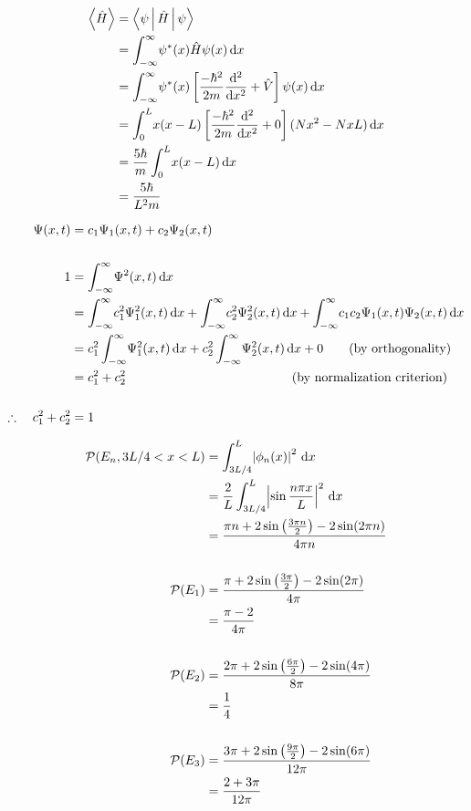 \documentclass[12pt]{article}
\begin{document}
\problemasub
\begin{align*}
\Braket{\hat{H}} &= \Braket{\psi|\hat{H}|\psi} \\
&= \int_{-\infty}^{\infty}\! \psi^*(x)\hat{H}\psi(x) \,\mathrm{d} x \\
&= \int_{-\infty}^{\infty}\! \psi^*(x)\left[\frac{-\hbar^2}{2m}\frac{\mathrm{d}^2}{\mathrm{d} x^2} + \hat{V}\right]\psi(x) \,\mathrm{d} x \\
&= \int_{0}^{L}\! x(x-L)\left[\frac{-\hbar^2}{2m}\frac{\mathrm{d}^2}{\mathrm{d} x^2} + 0\right] (Nx^2-NxL) \,\mathrm{d} x \\
&= \frac{5\hbar}{m}\int_{0}^{L}\! x(x-L) \,\mathrm{d} x \\
&= \frac{5\hbar}{L^2m} \\
\end{align*}

\newpage
{}
\problem
\begin{align*}
\Psi(x,t) &= c_1\Psi_1(x,t) + c_2\Psi_2(x,t) \\
\\
1 &= \int_{-\infty}^{\infty} \! \Psi^2(x,t) \, \mathrm{d} x \\
 &= \int_{-\infty}^{\infty} \! c_1^2\Psi_1^2(x,t) \, \mathrm{d} x + \int_{-\infty}^{\infty} \! c_2^2\Psi_2^2(x,t) \, \mathrm{d} x + \int_{-\infty}^{\infty} \! c_1c_2\Psi_1(x,t)\Psi_2(x,t) \, \mathrm{d} x \\ 
 &= c_1^2\int_{-\infty}^{\infty} \! \Psi_1^2(x,t) \, \mathrm{d} x + c_2^2\int_{-\infty}^{\infty} \! \Psi_2^2(x,t) \, \mathrm{d} x + 0 \qquad \text{(by orthogonality)} \\
 &= c_1^2 + c_2^2 \qquad\qquad\qquad\qquad\quad\qquad\qquad\text{(by normalization criterion)} \\
 \\
\therefore \quad c_1^2 + c_2^2 &= 1
\end{align*}

\problem
\begin{align*}
\mathcal{P}(E_n, 3L/4 < x < L) &= \int_{3L/4}^{L}\! \left|\phi_n(x)\right|^2 \,\mathrm{d} x \\
&= \frac{2}{L} \int_{3L/4}^{L}\! \left|\sin\frac{n\pi x}{L}\right|^2\,\mathrm{d} x \\
&= \frac{\pi n+2 \sin\left(\frac{3 \pi n}{2}\right)-2 \sin(2 \pi n)}{4 \pi n} \\
\\
\mathcal{P}(E_1) &= \frac{\pi +2 \sin\left(\frac{3 \pi}{2}\right)-2 \sin(2 \pi)}{4 \pi} \\
&= \frac{\pi - 2}{4\pi} \\
\\
\mathcal{P}(E_2) &= \frac{2\pi +2 \sin\left(\frac{6 \pi}{2}\right)-2 \sin(4 \pi )}{8 \pi} \\
&= \frac{1}{4} \\
\\
\mathcal{P}(E_3) &= \frac{3\pi +2 \sin\left(\frac{9 \pi}{2}\right)-2 \sin(6 \pi)}{12 \pi} \\
&= \frac{2+3\pi}{12\pi}\\
\end{align*}
\end{document}
